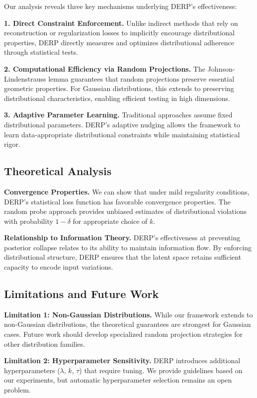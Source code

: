 \documentclass{article}
\begin{document}
Our analysis reveals three key mechanisms underlying DERP's effectiveness:

\textbf{1. Direct Constraint Enforcement.} Unlike indirect methods that rely on reconstruction or regularization losses to implicitly encourage distributional properties, DERP directly measures and optimizes distributional adherence through statistical tests.

\textbf{2. Computational Efficiency via Random Projections.} The Johnson-Lindenstrauss lemma guarantees that random projections preserve essential geometric properties. For Gaussian distributions, this extends to preserving distributional characteristics, enabling efficient testing in high dimensions.

\textbf{3. Adaptive Parameter Learning.} Traditional approaches assume fixed distributional parameters. DERP's adaptive nudging allows the framework to learn data-appropriate distributional constraints while maintaining statistical rigor.

\subsection{Theoretical Analysis}

\textbf{Convergence Properties.} We can show that under mild regularity conditions, DERP's statistical loss function has favorable convergence properties. The random probe approach provides unbiased estimates of distributional violations with probability $1-\delta$ for appropriate choice of $k$.

\textbf{Relationship to Information Theory.} DERP's effectiveness at preventing posterior collapse relates to its ability to maintain information flow. By enforcing distributional structure, DERP ensures that the latent space retains sufficient capacity to encode input variations.

\subsection{Limitations and Future Work}

\textbf{Limitation 1: Non-Gaussian Distributions.} While our framework extends to non-Gaussian distributions, the theoretical guarantees are strongest for Gaussian cases. Future work should develop specialized random projection strategies for other distribution families.

\textbf{Limitation 2: Hyperparameter Sensitivity.} DERP introduces additional hyperparameters ($\lambda$, $k$, $\tau$) that require tuning. We provide guidelines based on our experiments, but automatic hyperparameter selection remains an open problem.
\end{document}
